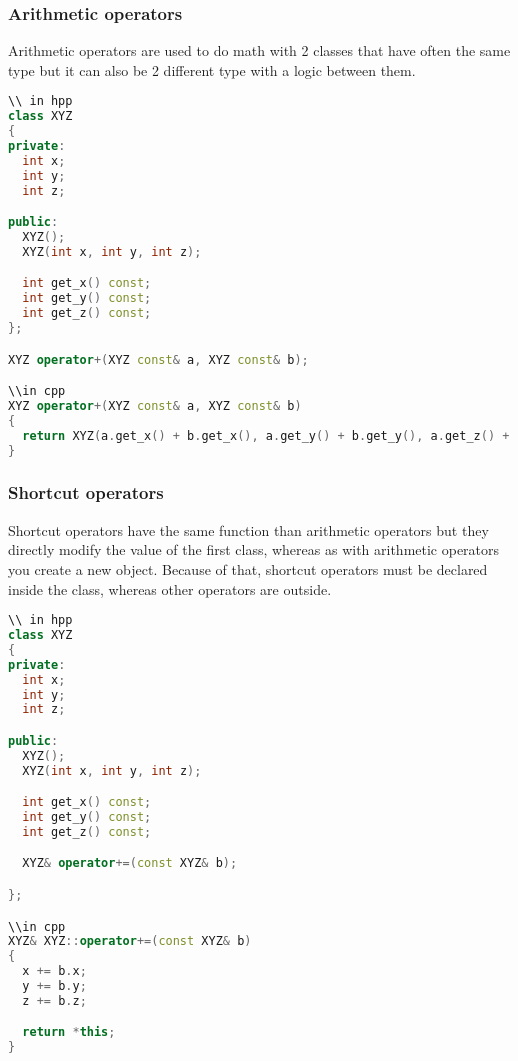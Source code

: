 \documentclass[a4paper, 12pt, titlepage]{scrartcl} %
\begin{document}
\subsubsection{Arithmetic operators}
Arithmetic operators are used to do math with 2 classes that have often the same type but it can also be 2 different type with a logic between them.

\vspace{5mm}

\begin{lstlisting}[language=C++]
\\ in hpp
class XYZ
{
private:
  int x;
  int y;
  int z;

public:
  XYZ();
  XYZ(int x, int y, int z);

  int get_x() const;
  int get_y() const;
  int get_z() const;
};

XYZ operator+(XYZ const& a, XYZ const& b);

\\in cpp
XYZ operator+(XYZ const& a, XYZ const& b)
{
  return XYZ(a.get_x() + b.get_x(), a.get_y() + b.get_y(), a.get_z() + b.get_z());
}
\end{lstlisting} \vspace{5mm}

\subsubsection{Shortcut operators}
Shortcut operators have the same function than arithmetic operators but they directly modify the value of the first class, whereas as with arithmetic operators you create a new object. Because of that, shortcut operators must be declared inside the class, whereas other operators are outside.

\vspace{5mm}

\begin{lstlisting}[language=C++]
\\ in hpp
class XYZ
{
private:
  int x;
  int y;
  int z;

public:
  XYZ();
  XYZ(int x, int y, int z);

  int get_x() const;
  int get_y() const;
  int get_z() const;

  XYZ& operator+=(const XYZ& b);

};

\\in cpp
XYZ& XYZ::operator+=(const XYZ& b)
{
  x += b.x;
  y += b.y;
  z += b.z;

  return *this;
}
\end{lstlisting} \vspace{5mm}
\end{document}
